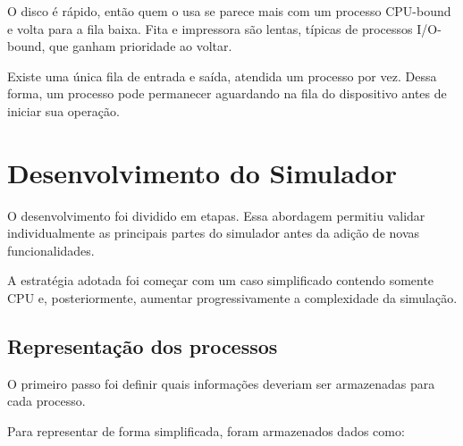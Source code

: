 \documentclass[12pt,a4paper]{article}
\begin{document}
O disco é rápido, então quem o usa se
parece mais com um processo CPU-bound e volta para a fila baixa. Fita
e impressora são lentas, típicas de processos I/O-bound, que ganham
prioridade ao voltar.

Existe uma única fila de entrada e saída, atendida um processo por
vez. Dessa forma, um processo pode permanecer aguardando na fila do dispositivo antes de
iniciar sua operação.



\section{Desenvolvimento do Simulador}

O desenvolvimento foi dividido em etapas. Essa abordagem permitiu
validar individualmente as principais partes do simulador antes da
adição de novas funcionalidades.

A estratégia adotada foi começar com um caso simplificado contendo
somente CPU e, posteriormente, aumentar progressivamente a
complexidade da simulação.



\subsection{Representação dos processos}

O primeiro passo foi definir quais informações deveriam ser
armazenadas para cada processo.

Para representar de forma simplificada, foram armazenados
dados como:
\end{document}
